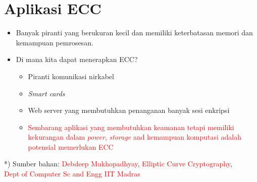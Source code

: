 \documentclass{article}
\begin{document}

\section*{Aplikasi ECC}

\begin{itemize}
    \item Banyak piranti yang berukuran kecil dan memiliki keterbatasan memori dan kemampuan pemrosesan.
    \item Di mana kita dapat menerapkan ECC?
    \begin{itemize}
        \item Piranti komunikasi nirkabel
        \item \textit{Smart cards}
        \item Web server yang membutuhkan penanganan banyak sesi enkripsi
        \item \textcolor{red}{Sembarang aplikasi yang membutuhkan keamanan tetapi memiliki kekurangan dalam \textit{power}, \textit{storage} and kemampuan komputasi adalah potensial memerlukan ECC}
    \end{itemize}
\end{itemize}

\vspace{10mm}

\centering
\small{*) Sumber bahan: \textcolor{red}{Debdeep Mukhopadhyay}, \textcolor{red}{Elliptic Curve Cryptography}, \\ \textcolor{red}{Dept of Computer Sc and Engg IIT Madras}}
\end{document}
